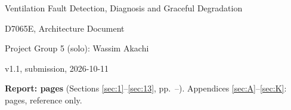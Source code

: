 \begin{center}
{\LARGE Ventilation Fault Detection, Diagnosis and Graceful Degradation\par}
\vspace{0.5em}
{\large D7065E, Architecture Document\par}
\vspace{1em}
{Project Group 5 (solo): Wassim Akachi\par}
\vspace{0.3em}
{\small v1.1, submission, 2026-10-11\par}
\vspace{0.6em}
{\small\textbf{Report:  pages} (Sections \ref{sec:1}--\ref{sec:13},
pp.~\pageref{sec:1}--\pageref{sec:13end}).
Appendices \ref{sec:A}--\ref{sec:K}:  pages, reference only.\par}
\end{center}

\vspace{0.8em}

